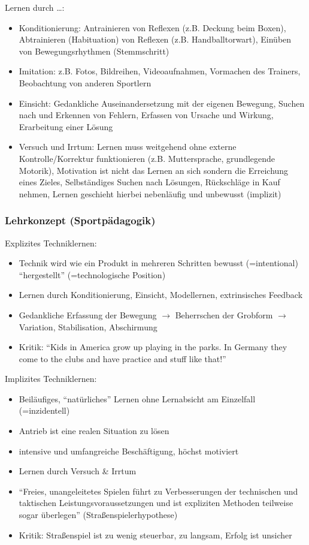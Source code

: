 Lernen durch \ldots:
\begin{itemize}
    \item Konditionierung: Antrainieren von Reflexen (z.B. Deckung beim Boxen), Abtrainieren (Habituation) von Reflexen (z.B. Handballtorwart), Einüben von Bewegungsrhythmen (Stemmschritt)
    \item Imitation: z.B. Fotos, Bildreihen, Videoaufnahmen, Vormachen des Trainers, Beobachtung von anderen Sportlern
    \item Einsicht: Gedankliche Auseinandersetzung mit der eigenen Bewegung, Suchen nach und Erkennen von Fehlern, Erfassen von Ursache und Wirkung, Erarbeitung einer Lösung
    \item Versuch und Irrtum: Lernen muss weitgehend ohne externe Kontrolle/Korrektur funktionieren (z.B. Muttersprache, grundlegende Motorik), Motivation ist nicht das Lernen an sich sondern die Erreichung eines Zieles, Selbständiges Suchen nach Lösungen, Rückschläge in Kauf nehmen, Lernen geschieht hierbei nebenläufig und unbewusst (implizit)
\end{itemize}

\subsubsection*{Lehrkonzept (Sportpädagogik)}

Explizites Techniklernen:
\begin{itemize}
    \item Technik wird wie ein Produkt in mehreren Schritten bewusst (=intentional) ``hergestellt'' (=technologische Position)
    \item Lernen durch Konditionierung, Einsicht, Modellernen, extrinsisches Feedback
    \item Gedankliche Erfassung der Bewegung $\rightarrow$ Beherrschen der Grobform $\rightarrow$ Variation, Stabilisation, Abschirmung
    \item Kritik: ``Kids in America grow up playing in the parks. In Germany they come to the clubs and have practice and stuff like that!''
\end{itemize}

Implizites Techniklernen:
\begin{itemize}
    \item Beiläufiges, ``natürliches'' Lernen ohne Lernabsicht am Einzelfall (=inzidentell)
    \item Antrieb ist eine realen Situation zu lösen
    \item intensive und umfangreiche Beschäftigung, höchst motiviert
    \item Lernen durch Versuch \& Irrtum
    \item ``Freies, unangeleitetes Spielen führt zu Verbesserungen der technischen und taktischen Leistungsvoraussetzungen und ist expliziten Methoden teilweise sogar überlegen'' (Straßenspielerhypothese)
    \item Kritik: Straßenspiel ist zu wenig steuerbar, zu langsam, Erfolg ist unsicher
\end{itemize}

